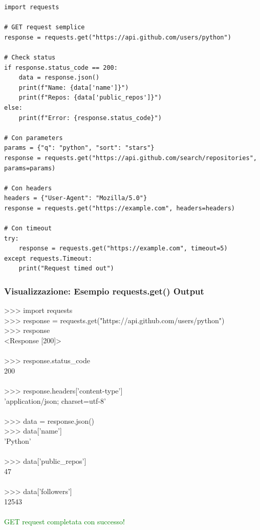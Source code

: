 \begin{lstlisting}
import requests

# GET request semplice
response = requests.get("https://api.github.com/users/python")

# Check status
if response.status_code == 200:
    data = response.json()
    print(f"Name: {data['name']}")
    print(f"Repos: {data['public_repos']}")
else:
    print(f"Error: {response.status_code}")

# Con parameters
params = {"q": "python", "sort": "stars"}
response = requests.get("https://api.github.com/search/repositories", params=params)

# Con headers
headers = {"User-Agent": "Mozilla/5.0"}
response = requests.get("https://example.com", headers=headers)

# Con timeout
try:
    response = requests.get("https://example.com", timeout=5)
except requests.Timeout:
    print("Request timed out")
\end{lstlisting}

\subsubsection{Visualizzazione: Esempio requests.get() Output}

\begin{center}
\begin{tcolorbox}[title=Terminal Output: requests.get(), colback=black!5, coltitle=white, colbacktitle=green!50!black, width=0.95\textwidth, fonttitle=\bfseries\ttfamily, fontupper=\small\ttfamily]
>>> import requests\\
>>> response = requests.get("https://api.github.com/users/python")\\
>>> response\\
<Response [200]>\\
\\
>>> response.status\_code\\
200\\
\\
>>> response.headers['content-type']\\
'application/json; charset=utf-8'\\
\\
>>> data = response.json()\\
>>> data['name']\\
'Python'\\
\\
>>> data['public\_repos']\\
47\\
\\
>>> data['followers']\\
12543\\
\\
\textcolor{green}{GET request completata con successo!}
\end{tcolorbox}
\end{center}

